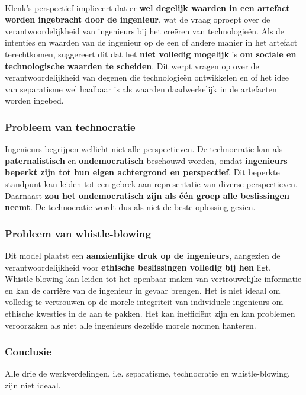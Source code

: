 \documentclass[../summary.tex]{subfiles}
\begin{document}
	\ \\
	Klenk's perspectief impliceert dat er \textbf{wel degelijk waarden in een artefact worden ingebracht door de ingenieur}, wat de vraag oproept over de verantwoordelijkheid van ingenieurs bij het creëren van technologieën. Als de intenties en waarden van de ingenieur op de een of andere manier in het artefact terechtkomen, suggereert dit dat het \textbf{niet volledig mogelijk} is \textbf{om sociale en technologische waarden te scheiden}. Dit werpt vragen op over de verantwoordelijkheid van degenen die technologieën ontwikkelen en of het idee van separatisme wel haalbaar is als waarden daadwerkelijk in de artefacten worden ingebed.
	
	\subsubsection{Probleem van technocratie}
	
	Ingenieurs begrijpen wellicht niet alle perspectieven. De technocratie kan als \textbf{paternalistisch} en \textbf{ondemocratisch} beschouwd worden, omdat \textbf{ingenieurs beperkt zijn tot hun eigen achtergrond en perspectief}. Dit beperkte standpunt kan leiden tot een gebrek aan representatie van diverse perspectieven. Daarnaast \textbf{zou het ondemocratisch zijn als één groep alle beslissingen neemt}. De technocratie wordt dus als niet de beste oplossing gezien.
	
	\subsubsection{Probleem van whistle-blowing}
	
	Dit model plaatst een \textbf{aanzienlijke druk op de ingenieurs}, aangezien de verantwoordelijkheid voor \textbf{ethische beslissingen volledig bij hen} ligt. Whistle-blowing kan leiden tot het openbaar maken van vertrouwelijke informatie en kan de carrière van de ingenieur in gevaar brengen. Het is niet ideaal om volledig te vertrouwen op de morele integriteit van individuele ingenieurs om ethische kwesties in de aan te pakken. Het kan inefficiënt zijn en kan problemen veroorzaken als niet alle ingenieurs dezelfde morele normen hanteren.
	
	\subsubsection{Conclusie}
	
	Alle drie de werkverdelingen, i.e. separatisme, technocratie en whistle-blowing, zijn niet ideaal.
	
\end{document}
